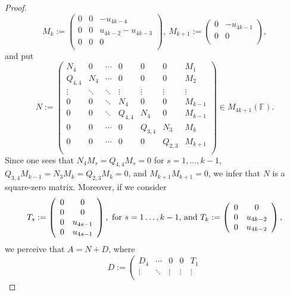 \documentclass{amsart}
\theoremstyle{definition}
\theoremstyle{remark}
\numberwithin{equation}{section}
\begin{document}
\begin{proof}
 $$M_{k}:=\left(
   \begin{array}{ccc}
      0& 0 &-u_{4k-4}\\
      0 & 0 &u_{4k-2}-u_{4k-3}\\
      0 & 0 &0\\
   \end{array}
 \right),\ M_{k+1}:=\left(
   \begin{array}{cc}
      0 &-u_{4k-1}\\
      0 &0\\
   \end{array}
 \right),$$
and put
$$N:=\left(
      \begin{array}{ccccccc}
        N_4 & 0 & \cdots &  0 & 0& 0 & M_1 \\
        Q_{4,4} & N_4 & \cdots  & 0& 0 & 0 & M_2 \\
        \vdots & \ddots & \ddots  & \vdots &\vdots & \vdots & \vdots \\
        0 & 0 & \ddots   & N_4 & 0& 0 & M_{k-1} \\
        0 & 0 & \ddots   & Q_{4,4} & N_4& 0 & M_{k-1} \\
        0 & 0 & \cdots  &0&  Q_{3,4} & N_3 & M_{k} \\
        0 & 0 & \cdots  & 0& 0 &Q_{2,3} & M_{k+1} \\
      \end{array}
    \right)\in M_{4k+1}(\mathbb{F}).$$
Since one sees that $N_4 M_s=Q_{4,4} M_s=0$ for $s=1,\dots, k-1$, $Q_{3,4}M_{k-1}=N_3M_k=Q_{2,3}M_k=0$, and $M_{k+1} M_{k+1}=0$, we infer that $N$ is a square-zero matrix. Moreover, if we consider
$$T_s:=\left(
   \begin{array}{cc}
      0 &0\\
      0 &0\\
      0 &u_{4s-1}\\
      0 &u_{4s-1}\\
   \end{array}
 \right),\hbox{ for $s=1\dots, k-1$, and} ~ T_{k}:=\left(
   \begin{array}{cc}
       0 &0\\
       0 &u_{4k-2}\\
       0 &u_{4k-2}\\
   \end{array}
 \right),
$$
we perceive that $A=N+D$, where
$$D:=\left(
         \begin{array}{ccccc}
           D_4 & \cdots & 0 & 0 & T_1 \\
           \vdots & \ddots & \vdots & \vdots & \vdots \\

\end{array}$$
\end{proof}
\end{document}
